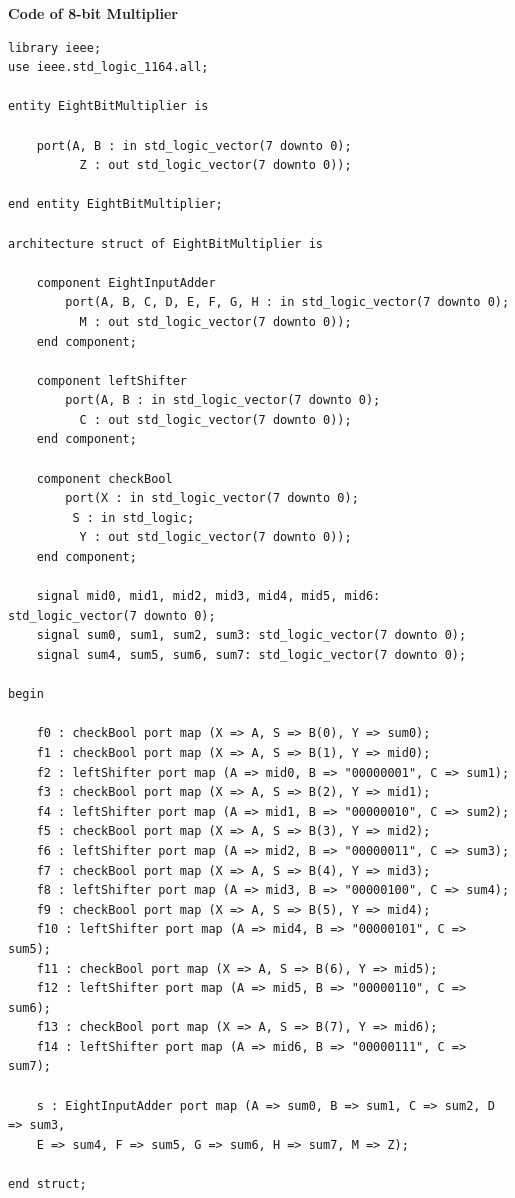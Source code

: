 \documentclass[12pt]{article}
\begin{document}
        \noindent
        \textbf{Code of 8-bit Multiplier}
        \noindent
        \begin{verbatim}
library ieee;
use ieee.std_logic_1164.all;

entity EightBitMultiplier is

	port(A, B : in std_logic_vector(7 downto 0);
		  Z : out std_logic_vector(7 downto 0));
		  
end entity EightBitMultiplier;

architecture struct of EightBitMultiplier is

	component EightInputAdder
		port(A, B, C, D, E, F, G, H : in std_logic_vector(7 downto 0);
		  M : out std_logic_vector(7 downto 0));
	end component;

	component leftShifter
		port(A, B : in std_logic_vector(7 downto 0);
		  C : out std_logic_vector(7 downto 0));
	end component;

	component checkBool
		port(X : in std_logic_vector(7 downto 0);
		 S : in std_logic;
		  Y : out std_logic_vector(7 downto 0));
	end component;

	signal mid0, mid1, mid2, mid3, mid4, mid5, mid6: std_logic_vector(7 downto 0);
	signal sum0, sum1, sum2, sum3: std_logic_vector(7 downto 0);
	signal sum4, sum5, sum6, sum7: std_logic_vector(7 downto 0);
	
begin

	f0 : checkBool port map (X => A, S => B(0), Y => sum0);
	f1 : checkBool port map (X => A, S => B(1), Y => mid0);
	f2 : leftShifter port map (A => mid0, B => "00000001", C => sum1); 
	f3 : checkBool port map (X => A, S => B(2), Y => mid1);
	f4 : leftShifter port map (A => mid1, B => "00000010", C => sum2); 
	f5 : checkBool port map (X => A, S => B(3), Y => mid2);
	f6 : leftShifter port map (A => mid2, B => "00000011", C => sum3); 
	f7 : checkBool port map (X => A, S => B(4), Y => mid3);
	f8 : leftShifter port map (A => mid3, B => "00000100", C => sum4); 
	f9 : checkBool port map (X => A, S => B(5), Y => mid4);
	f10 : leftShifter port map (A => mid4, B => "00000101", C => sum5); 
	f11 : checkBool port map (X => A, S => B(6), Y => mid5);
	f12 : leftShifter port map (A => mid5, B => "00000110", C => sum6); 
	f13 : checkBool port map (X => A, S => B(7), Y => mid6);
	f14 : leftShifter port map (A => mid6, B => "00000111", C => sum7);

	s : EightInputAdder port map (A => sum0, B => sum1, C => sum2, D => sum3,
	E => sum4, F => sum5, G => sum6, H => sum7, M => Z); 
	
end struct;
        \end{verbatim}
    
\end{document}
